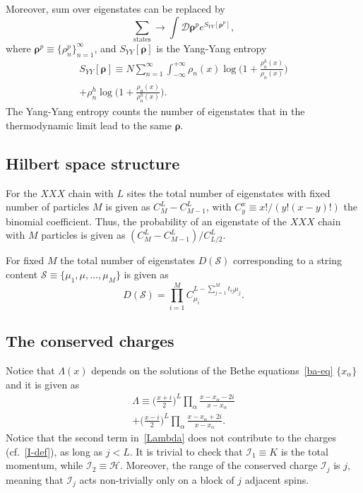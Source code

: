 \documentclass[twocolumn,superscriptaddress,prb,10pt]{revtex4-1}
\begin{document}
Moreover, sum over eigenstates can be replaced by 
%
\begin{equation}
\sum\limits_{\textrm{states}}\rightarrow\int{\mathcal D}
\pmb{\rho}^pe^{S_{YY}[\pmb{\rho}^p]},
\end{equation}
%
where $\pmb{\rho}^p\equiv\{\rho^p_n\}_{n=1}^\infty$, and $S_{YY}[\pmb{\rho}]$ 
is the Yang-Yang entropy
%
\begin{multline}
S_{YY}[\pmb{\rho}]\equiv N\sum\limits_{n=1}^\infty\int_{-\infty}^{+\infty}
\rho_n(x)\log\Big(1+\frac{\rho_n^h(x)}{\rho_n(x)}\Big)\\
+\rho_n^h\log\Big(1+\frac{\rho_n(x)}{\rho_n^h(x)}\Big).
\end{multline}
%
The Yang-Yang entropy counts the number of eigenstates that in the 
thermodynamic limit lead to the same $\pmb{\rho}$. 




\subsection{Hilbert space structure}


For the $XXX$ chain with $L$ sites the total number of eigenstates with 
fixed number of particles $M$ is given as $C_M^L-C_{M-1}^L$, with 
$C_y^x\equiv x!/(y!(x-y)!)$ the binomial coefficient. Thus, the probability 
of an eigenstate of the $XXX$ chain with $M$ particles is given as 
$(C_M^L-C_{M-1}^L)/C_{L/2}^L$. 

For fixed $M$ the total number of eigenstates $D({\mathcal S})$ corresponding 
to a string content ${\mathcal S}\equiv\{\mu_1,\mu,\dots,\mu_M\}$ is given as 
%
\begin{equation}
\label{str-prob}
D({\mathcal S})=\prod_{i=1}^MC_{\mu_i}^{L-\sum_{j=1}^M t_{ij}\mu_j}.
\end{equation}
%

\subsection{The conserved charges}

Notice that $\Lambda(x)$ depends on the 
solutions of the Bethe equations~\eqref{ba-eq}  $\{x_\alpha\}$  and it is given 
as 
%
\begin{multline}
\label{Lambda}
\Lambda\equiv\Big(\frac{x+i}{2}\Big)^L\prod\limits_\alpha\frac{x-x_\alpha-2i}{x-
x_\alpha}\\+\Big(\frac{x-i}{2}\Big)^L\prod\limits_\alpha\frac{x-x_\alpha+2i}
{x-x_\alpha}. 
\end{multline}
%
Notice that the second term in~\eqref{Lambda} does not contribute to the charges 
(cf.~\eqref{I-def}), as long as $j<L$. It is trivial to check that ${\mathcal I}_1
\equiv K$ is the total momentum, while ${\mathcal I}_2\equiv {\mathcal H}$. Moreover, 
the range of the conserved charge ${\mathcal I}_j$ is $j$, meaning that ${\mathcal I}_j$ 
acts non-trivially only on a block of $j$ adjacent spins. 
\end{document}

